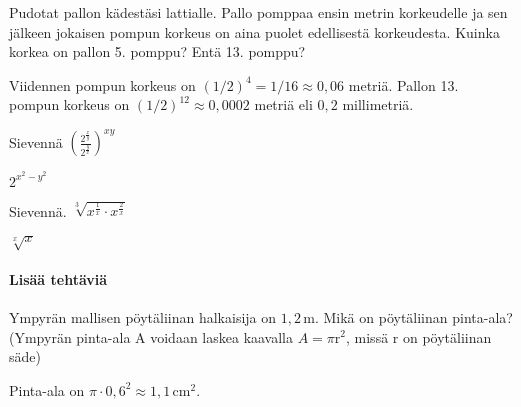 \begin{tehtavasivu}
\begin{tehtava}
\begin{vastaus}
\end{vastaus}
\end{tehtava}

\begin{tehtava}
        Pudotat pallon kädestäsi lattialle. Pallo pomppaa ensin metrin korkeudelle ja sen jälkeen jokaisen pompun korkeus on aina puolet edellisestä korkeudesta. Kuinka korkea on pallon 5. pomppu? Entä 13. pomppu?     
        \begin{vastaus}
        Viidennen pompun korkeus on $(1/2)^4=1/16 \approx 0,06$ metriä. Pallon 13. pompun korkeus on $(1/2)^{12} \approx 0,0002$ metriä eli $0,2$ millimetriä.
        \end{vastaus}
\end{tehtava}

\begin{tehtava}
Sievennä
$( \frac{2^{\frac{x}{y}}}{2^{\frac{y}{x}}} )^{xy}$
\begin{vastaus}
 $2^{x^2 - y^2}$
\end{vastaus}


\end{tehtava}

\begin{tehtava}
Sievennä.
$\sqrt[3]{ x^{\frac{1}{x}} \cdot x^{\frac{2}{x}} }$
 \begin{vastaus}
  $\sqrt[x]{x}$
 \end{vastaus}
\end{tehtava}
 
\paragraph*{Lisää tehtäviä}

    \begin{tehtava}
        Ympyrän mallisen pöytäliinan halkaisija on $1,2$\,m.  Mikä on pöytäliinan pinta-ala? (Ympyrän pinta-ala A voidaan laskea kaavalla $A=\pi\text{r}^2$, missä r on pöytäliinan säde)
        \begin{vastaus}
        Pinta-ala on $\pi \cdot 0,6^2 \approx 1,1\,$cm$^2$.
        \end{vastaus}
\end{tehtava}


\end{tehtavasivu}
